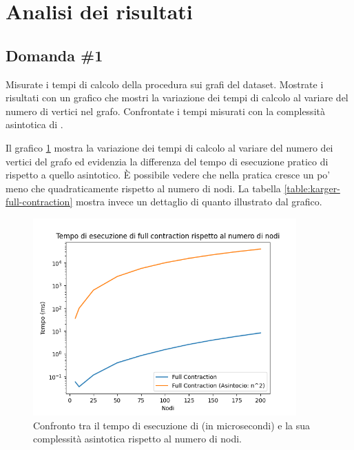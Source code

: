 \section{Analisi dei risultati}
\label{cap:performance-analysis}

\subsection{Domanda \#1}
\label{sec:question-1}

\begin{displayquote}
Misurate i tempi di calcolo della procedura
 sui grafi del dataset. Mostrate i
risultati con un grafico che mostri la variazione dei tempi di calcolo
al variare del numero di vertici nel grafo. Confrontate i tempi
misurati con la complessità asintotica di
.
\end{displayquote}

\noindent Il grafico \ref{fig:karger-full-contraction-chart} mostra la
variazione dei tempi di calcolo al variare del numero dei vertici del
grafo ed evidenzia la differenza del tempo di esecuzione pratico di
 rispetto a quello asintotico. È possibile vedere che nella pratica  cresce un po' meno che quadraticamente rispetto al numero di nodi. La tabella \ref{table:karger-full-contraction} mostra invece
un dettaglio di quanto illustrato dal grafico.

\begin{figure}[H]
    \centering

    \includegraphics[width=0.9\textwidth]{./images/Tempo_di_esecuzione_di_full_contraction_rispetto_al_numero_di_nodi.png}

    \caption{Confronto tra il tempo di esecuzione di  (in microsecondi) e la sua complessità asintotica rispetto al numero di nodi.}
    \label{fig:karger-full-contraction-chart}
\end{figure}

